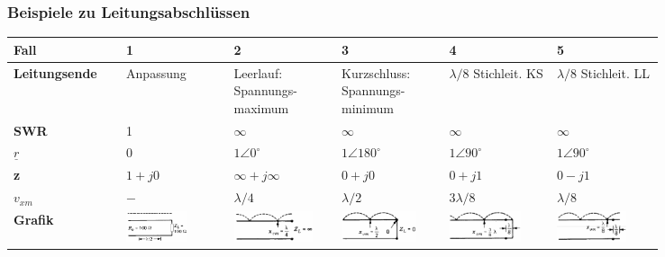 \subsubsection{Beispiele zu Leitungsabschlüssen}
		\renewcommand{\arraystretch}{1.1}
		\begin{tabular}{| p{0.14\linewidth} | p{0.14\linewidth}  | p{0.14\linewidth}  | p{0.14\linewidth}  | p{0.14\linewidth}  | p{0.14\linewidth}  |}
			\hline
				\textbf{Fall}
				& 1
				& 2 
				& 3
				& 4
				& 5 \\
			\hline
				\textbf{Leitungsende}
				& Anpassung
				& Leerlauf: \newline Spannungs-\newline maximum
				& Kurzschluss: \newline Spannungs-\newline minimum
				& $\lambda/8$ Stichleit. KS
				& $\lambda/8$ Stichleit. LL \\
			\hline
				\textbf{SWR}
				& 1
				& $\infty$
				& $\infty$
				& $\infty$
				& $\infty$ \\
			\hline
				\textbf{$\underline{r}$}
				& $0$
				& $1 \angle 0 ^\circ$
				& $1 \angle 180 ^\circ$
				& $1 \angle 90 ^\circ$
				& $1 \angle 90 ^\circ$\\
			\hline
				\textbf{z}
				& $1+j0$
				& $\infty+j\infty$
				& $0+j0$
				& $0+j1$
				& $0-j1$ \\
			\hline
				\textbf{$v_{xm}$}
				& $-$
				& $\lambda/4$
				& $\lambda/2$
				& $3\lambda/8$
				& $\lambda/8$ \\
			\hline
				\textbf{Grafik}
				& \includegraphics[height=0.9cm]{./bilder/Fall1.png}
				& \includegraphics[height=0.9cm]{./bilder/Fall2.png}
				& \includegraphics[height=0.9cm]{./bilder/Fall3.png}
				& \includegraphics[height=0.9cm]{./bilder/Fall4.png}
				& \includegraphics[height=0.9cm]{./bilder/Fall5.png} \\
			\hline
		\end{tabular}


